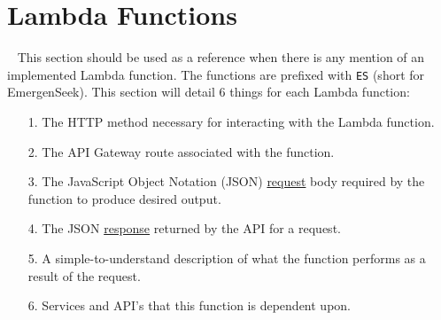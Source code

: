 \documentclass[10pt, a4paper]{article}
\begin{document}
\section{Lambda Functions}
\label{sec:lf}
\par ~ This section should be used as a reference when there is any mention of an implemented Lambda function. The functions are prefixed with \texttt{ES} (short for EmergenSeek). This section will detail 6 things for each Lambda function:
	\begin{enumerate}
		\item[1.] The HTTP method necessary for interacting with the Lambda function.
		\item[2.] The API Gateway route associated with the function.
		\item[3.] The JavaScript Object Notation (JSON) \underline{request} body required by the function to produce desired output.
		\item[4.] The JSON \underline{response} returned by the API for a request.
		\item[5.] A simple-to-understand description of what the function performs as a result of the request.
		\item[6.] Services and API's that this function is dependent upon.
	\end{enumerate}
	
\end{document}
